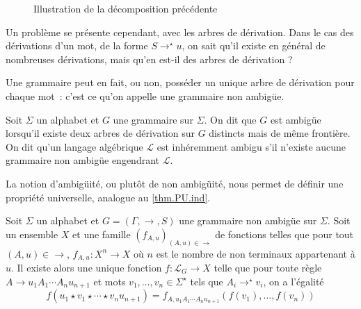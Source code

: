 \begin{figure}[ht]
  \centering
  \caption{Illustration de la décomposition précédente}
\end{figure}

Un problème se présente cependant, avec les arbres de dérivation. Dans le cas
des dérivations d'un mot, de la forme $S\to^\star u$, on sait qu'il existe en
général de nombreuses dérivations, mais qu'en est-il des arbres de dérivation ?

Une grammaire peut en fait, ou non, posséder un unique arbre de dérivation pour
chaque mot~: c'est ce qu'on appelle une grammaire non ambigüe.

\begin{definition}[Ambigüité]
  Soit $\Sigma$ un alphabet et $G$ une grammaire sur $\Sigma$. On dit que $G$
  est ambigüe lorsqu'il existe deux arbres de dérivation sur $G$ distincts mais
  de même frontière. On dit qu'un langage algébrique $\mathcal L$ est
  inhéremment ambigu s'il n'existe aucune grammaire non ambigüe engendrant
  $\mathcal L$.
\end{definition}

La notion d'ambigüité, ou plutôt de non ambigüité, nous permet de définir une
propriété universelle, analogue au \cref{thm.PU.ind}.

\begin{proposition}
  \label{prop.PU.gram}
  Soit $\Sigma$ un alphabet et $G=(\Gamma,\to,S)$ une grammaire non ambigüe sur
  $\Sigma$. Soit un ensemble $X$ et une famille $(f_{A,u})_{(A,u) \in \to}$ de
  fonctions telles que pour tout $(A,u) \in \to$, $f_{A,u} : X^n \to X$ où $n$
  est le nombre de non terminaux appartenant à $u$. Il existe alors une unique
  fonction $f : \mathcal L_G \to X$ telle que pour toute règle
  $A \to u_1A_1\cdots A_nu_{n+1}$ et mots $v_1,\ldots,v_n\in\Sigma^\star$ tels que
  $A_i \to^\star v_i$, on a l'égalité
  \[f(u_1\star v_1\star\cdots\star v_n u_{n+1}) =
  f_{A,u_1A_1\cdots A_nu_{n+1}}(f(v_1),\ldots,f(v_n))\]
\end{proposition}

